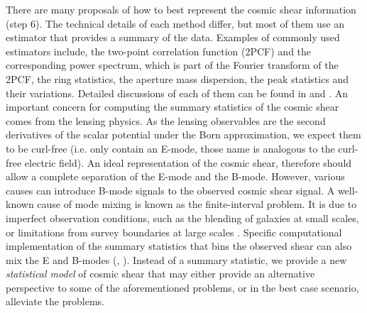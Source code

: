 There are many proposals of how to best represent the cosmic shear information
(step 6). The technical details of each method differ, but most of them use
an estimator that provides a summary of the data.
Examples of commonly used estimators include, the two-point correlation function 
(2PCF) and the corresponding power spectrum, which is part of the Fourier transform of the 2PCF, 
the ring statistics, the aperture mass dispersion, the peak statistics and
their variations. Detailed discussions of each of them can be found in 
\cite{Kilbinger2015} and \cite{Bartelmann2001a}.
An important concern for computing the summary statistics of the cosmic shear 
comes from the lensing physics. As the lensing observables are the second derivatives of the
scalar potential under the Born approximation, we expect them to be curl-free
(i.e. only contain an E-mode, those name is analogous to the curl-free electric
field). An ideal representation of the
cosmic shear, therefore should allow a complete separation of the E-mode and the B-mode.
However, various causes can
introduce B-mode signals to the observed cosmic shear signal. A well-known
cause of mode mixing is known as the finite-interval problem. It is due to
imperfect observation conditions, such as the blending of galaxies at small scales,
or limitations from survey boundaries at large scales \citep{Kilbinger2013}.  
Specific computational implementation of the summary statistics that bins the 
observed shear can also mix the E and B-modes 
(\citealt{Eifler2010},
\citealt{Becker2013}). Instead of a summary statistic, we provide a new 
{\it statistical model} of cosmic shear that may either provide an alternative
perspective to some of the aforementioned problems, or in the best case
scenario, alleviate the problems. 
 
